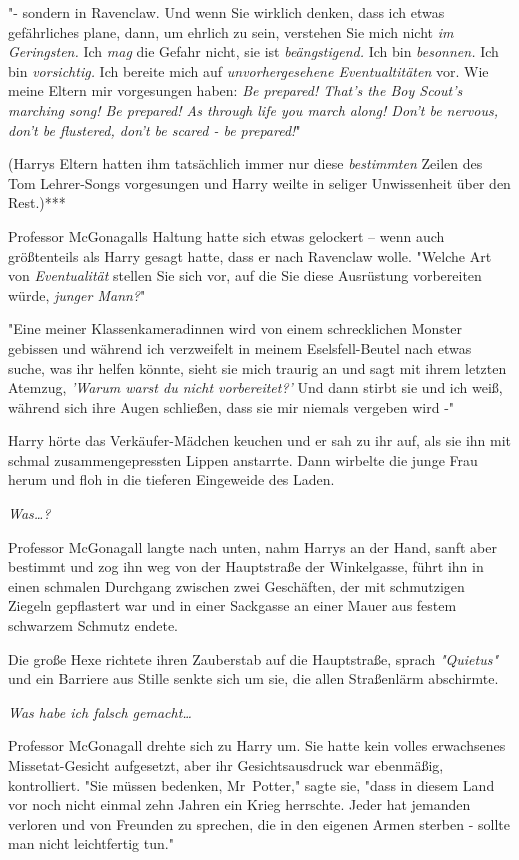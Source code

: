 {"- sondern in Ravenclaw. Und wenn Sie wirklich denken, dass ich etwas gefährliches plane, dann, um ehrlich zu sein, verstehen Sie mich nicht \emph{im Geringsten.} Ich \emph{mag} die Gefahr nicht, sie ist \emph{beängstigend.} Ich bin \emph{besonnen.} Ich bin \emph{vorsichtig.} Ich bereite mich auf \emph{unvorhergesehene Eventualtitäten} vor. Wie meine Eltern mir vorgesungen haben: \emph{Be prepared! That's the Boy Scout's marching song! Be prepared! As through life you march along! Don't be nervous, don't be flustered, don't be scared - be prepared!}"

(Harrys Eltern hatten ihm tatsächlich immer nur diese \emph{bestimmten} Zeilen des Tom Lehrer-Songs vorgesungen und Harry weilte in seliger Unwissenheit über den Rest.)***

Professor McGonagalls Haltung hatte sich etwas gelockert -- wenn auch größtenteils als Harry gesagt hatte, dass er nach Ravenclaw wolle. "Welche Art von \emph{Eventualität} stellen Sie sich vor, auf die Sie diese Ausrüstung vorbereiten würde, \emph{junger Mann?}"

"Eine meiner Klassenkameradinnen wird von einem schrecklichen Monster gebissen und während ich verzweifelt in meinem Eselsfell-Beutel nach etwas suche, was ihr helfen könnte, sieht sie mich traurig an und sagt mit ihrem letzten Atemzug, \emph{'Warum warst du nicht vorbereitet?'} Und dann stirbt sie und ich weiß, während sich ihre Augen schließen, dass sie mir niemals vergeben wird -"

Harry hörte das Verkäufer-Mädchen keuchen und er sah zu ihr auf, als sie ihn mit schmal zusammengepressten Lippen anstarrte. Dann wirbelte die junge Frau herum und floh in die tieferen Eingeweide des Laden.

\emph{Was…?}

Professor McGonagall langte nach unten, nahm Harrys an der Hand, sanft aber bestimmt und zog ihn weg von der Hauptstraße der Winkelgasse, führt ihn in einen schmalen Durchgang zwischen zwei Geschäften, der mit schmutzigen Ziegeln gepflastert war und in einer Sackgasse an einer Mauer aus festem schwarzem Schmutz endete.

Die große Hexe richtete ihren Zauberstab auf die Hauptstraße, sprach \emph{"Quietus"} und ein Barriere aus Stille senkte sich um sie, die allen Straßenlärm abschirmte.

\emph{Was habe ich falsch gemacht…}

Professor McGonagall drehte sich zu Harry um. Sie hatte kein volles erwachsenes Missetat-Gesicht aufgesetzt, aber ihr Gesichtsausdruck war ebenmäßig, kontrolliert. "Sie müssen bedenken, Mr~Potter," sagte sie, "dass in diesem Land vor noch nicht einmal zehn Jahren ein Krieg herrschte. Jeder hat jemanden verloren und von Freunden zu sprechen, die in den eigenen Armen sterben - sollte man nicht leichtfertig tun."

}
